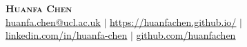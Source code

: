 \documentclass[A4,11pt]{article}
\begin{document}
\pagestyle{CVfooter}

\begin{comment}
Avoid using photos in academic CV
\end{comment}


\begin{center}
    \textbf{\Huge \scshape Huanfa Chen} \\ \vspace{1pt} %
    \href{mailto:huanfa.chen@ucl.ac.uk}{\underline{huanfa.chen@ucl.ac.uk}} $|$
    \href{huanfachen.github.io}{\underline{https://huanfachen.github.io/}} $|$\\
    \href{linkedin.com/in/huanfa-chen}{\underline{linkedin.com/in/huanfa-chen}} $|$
    \href{https://github.com/huanfachen}{\underline{github.com/huanfachen}}
\end{center}
\end{document}
